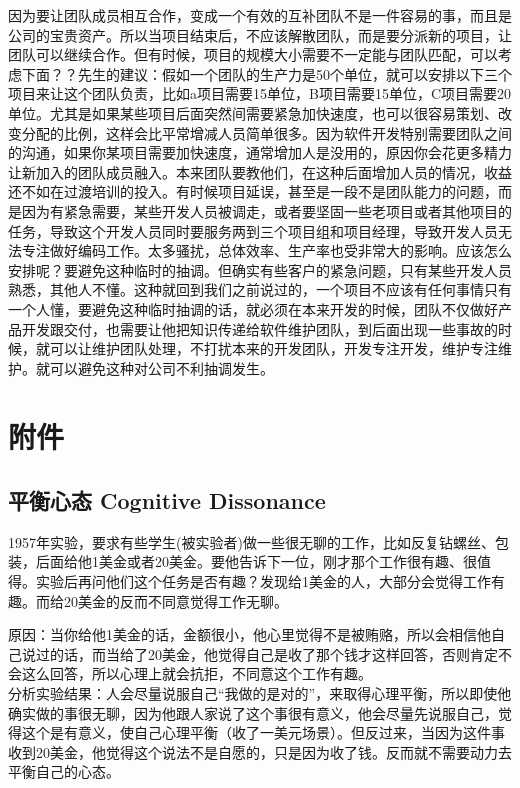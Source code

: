 因为要让团队成员相互合作，变成一个有效的互补团队不是一件容易的事，而且是公司的宝贵资产。所以当项目结束后，不应该解散团队，而是要分派新的项目，让团队可以继续合作。但有时候，项目的规模大小需要不一定能与团队匹配，可以考虑下面？？先生的建议：假如一个团队的生产力是50个单位，就可以安排以下三个项目来让这个团队负责，比如a项目需要15单位，B项目需要15单位，C项目需要20单位。尤其是如果某些项目后面突然间需要紧急加快速度，也可以很容易策划、改变分配的比例，这样会比平常增减人员简单很多。因为软件开发特别需要团队之间的沟通，如果你某项目需要加快速度，通常增加人是没用的，原因你会花更多精力让新加入的团队成员融入。本来团队要教他们，在这种后面增加人员的情况，收益还不如在过渡培训的投入。有时候项目延误，甚至是一段不是团队能力的问题，而是因为有紧急需要，某些开发人员被调走，或者要坚固一些老项目或者其他项目的任务，导致这个开发人员同时要服务两到三个项目组和项目经理，导致开发人员无法专注做好编码工作。太多骚扰，总体效率、生产率也受非常大的影响。应该怎么安排呢？要避免这种临时的抽调。但确实有些客户的紧急问题，只有某些开发人员熟悉，其他人不懂。这种就回到我们之前说过的，一个项目不应该有任何事情只有一个人懂，要避免这种临时抽调的话，就必须在本来开发的时候，团队不仅做好产品开发跟交付，也需要让他把知识传递给软件维护团队，到后面出现一些事故的时候，就可以让维护团队处理，不打扰本来的开发团队，开发专注开发，维护专注维护。就可以避免这种对公司不利抽调发生。


\hypertarget{ux9644ux4ef6}{%
\section{附件}\label{ux9644ux4ef6}}

\hypertarget{a1ux5e73ux8861ux5fc3ux6001-cognitive-dissonance}{%
\subsection{平衡心态 Cognitive
Dissonance}\label{a1ux5e73ux8861ux5fc3ux6001-cognitive-dissonance}}

1957年实验，要求有些学生(被实验者)做一些很无聊的工作，比如反复钻螺丝、包装，后面给他1美金或者20美金。要他告诉下一位，刚才那个工作很有趣、很值得。实验后再问他们这个任务是否有趣？发现给1美金的人，大部分会觉得工作有趣。而给20美金的反而不同意觉得工作无聊。

原因：当你给他1美金的话，金额很小，他心里觉得不是被贿赂，所以会相信他自己说过的话，而当给了20美金，他觉得自己是收了那个钱才这样回答，否则肯定不会这么回答，所以心理上就会抗拒，不同意这个工作有趣。\\
分析实验结果：人会尽量说服自己``我做的是对的''，来取得心理平衡，所以即使他确实做的事很无聊，因为他跟人家说了这个事很有意义，他会尽量先说服自己，觉得这个是有意义，使自己心理平衡（收了一美元场景）。但反过来，当因为这件事收到20美金，他觉得这个说法不是自愿的，只是因为收了钱。反而就不需要动力去平衡自己的心态。

